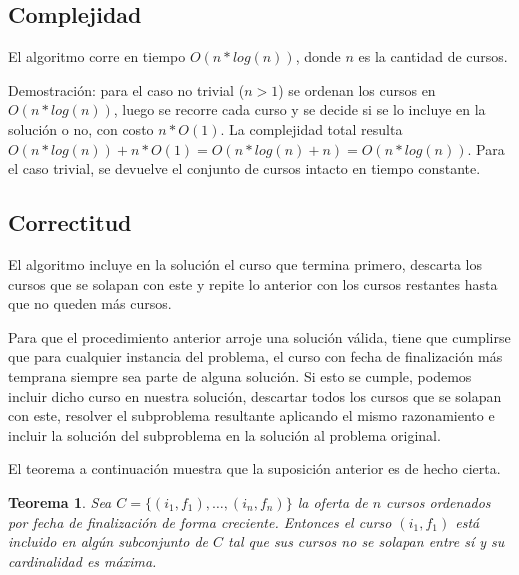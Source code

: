 \documentclass[a4paper, 10pt, twoside]{article}
\begin{document}
\subsection{Complejidad}

El algoritmo corre en tiempo $O(n*log(n))$, donde $n$ es la cantidad de cursos.

Demostración: para el caso no trivial ($n > 1$) se ordenan los cursos en $O(n * log(n))$, luego se recorre cada curso y se decide si se lo incluye en la solución o no, con costo $n * O(1)$. La complejidad total resulta $O(n * log(n)) + n * O(1) = O(n * log(n) + n) = O(n * log(n))$. Para el caso trivial, se devuelve el conjunto de cursos intacto en tiempo constante.


\subsection{Correctitud}

El algoritmo incluye en la solución el curso que termina primero, descarta los cursos que se solapan con este y repite lo anterior con los cursos restantes hasta que no queden más cursos.

Para que el procedimiento anterior arroje una solución válida, tiene que cumplirse que para cualquier instancia del problema, el curso con fecha de finalización más temprana siempre sea parte de alguna solución. Si esto se cumple, podemos incluir dicho curso en nuestra solución, descartar todos los cursos que se solapan con este, resolver el subproblema resultante aplicando el mismo razonamiento e incluir la solución del subproblema en la solución al problema original.

El teorema a continuación muestra que la suposición anterior es de hecho cierta.

\newtheorem*{teorema-ej2}{Teorema}

\begin{teorema-ej2}
    Sea $C = \{ (i_1, f_1), \ldots, (i_n, f_n) \}$ la oferta de $n$ cursos ordenados por fecha de finalización de forma creciente. Entonces el curso $(i_1, f_1)$ está incluido en algún subconjunto de $C$ tal que sus cursos no se solapan entre sí y su cardinalidad es máxima.
\end{teorema-ej2}
\end{document}
